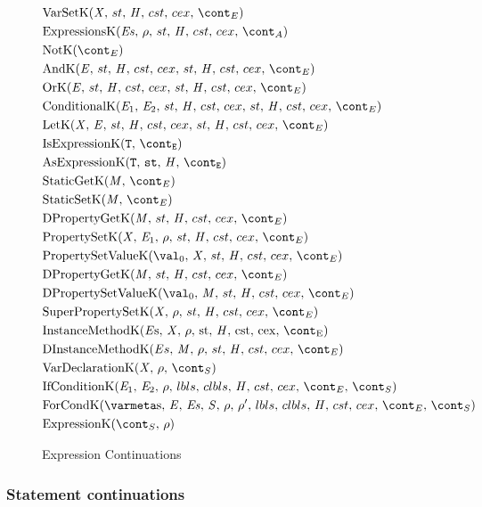 \documentclass{article}
\begin{document}
\begin{figure}[Htp]
  \begin{align}
	&\VarSetK{\idmeta}{\ExceptionHandlers}{\econt} \label{econt:varset}\\
	&\ExpressionsK{\exprs}{\env}{\acont} \label{econt:expressions}\\
	&\NotK{\econt} \label{econt:not}\\
	&\AndK{\expressionmeta}{\ExceptionHandlers}{\econt} \label{econt:and}\\
	&\OrK{\expressionmeta}{\ExceptionHandlers}{\econt} \label{econt:or}\\
	&\ConditionalK{\expressionmeta_1}{\expressionmeta_2}{\ExceptionHandlers}{\econt} \label{econt:cond}\\
	&\LetK{\idmeta}{\expressionmeta}{\ExceptionHandlers}{\econt} \label{econt:let}\\
	&\IsExpressionK \label{econt:is}\\
	&\AsExpressionK \label{econt:as}\\
	&\StaticGetK \label{econt:static-get}\\
	&\StaticSetK \label{econt:static-set}\\
	&\DPropertyGetK \label{econt:dproperty-get}\\
	&\PropertySetK \label{econt:property-set}\\
	&\PropertySetVK \label{econt:property-set}\\
	&\DPropertyGetK \label{econt:dproperty-set}\\
	&\DPropertySetVK \label{econt:dproperty-set-v}\\
	&\SuperPropertySetK \label{econt:super-property-set}\\
	&\InstanceMethodK \label{econt:instance-method}\\
	&\DInstanceMethodK \label{econt:dinstance-method}\\
	&\VarDeclK{\idmeta}{\env}{\scont} \label{econt:var-decl}\\
	&\IfCondK{\expressionmeta_1}{\expressionmeta_2} \label{econt:if-cond}\\
	&\ForCondK \label{econt:for-cond}\\
	&\ExpressionK{\scont}{\env} \label{econt:expression}
  \end{align}
  \caption{Expression Continuations}
  \label{figure:econts}
\end{figure}

\subsubsection{Statement continuations}
\label{subsubsec:statement-continuations}
\end{document}
